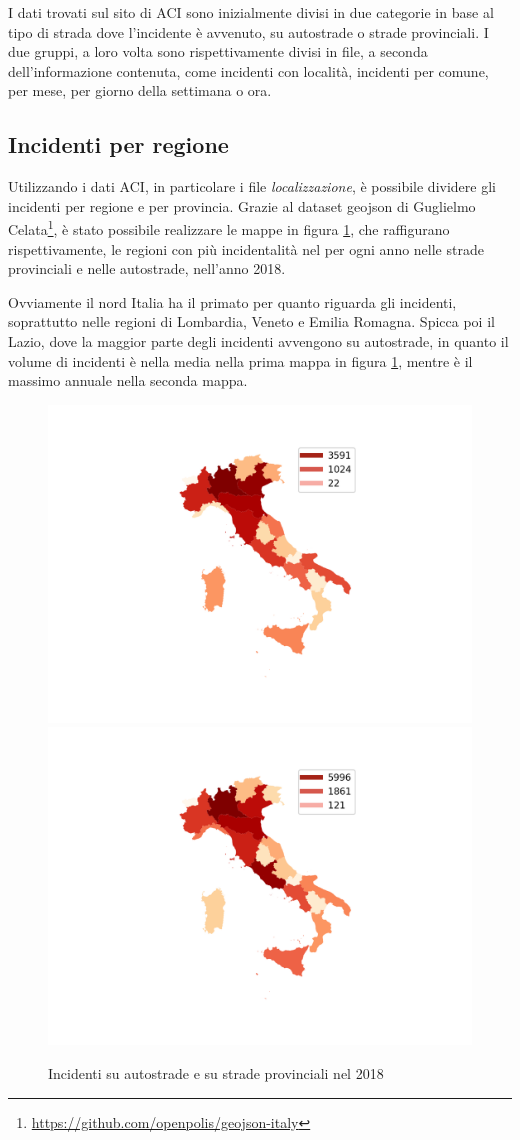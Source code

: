 \documentclass[a4paper]{report}
\begin{document}
I dati trovati sul sito di ACI sono inizialmente divisi in due categorie in 
base al tipo di strada dove l'incidente è avvenuto, su autostrade o strade provinciali.
I due gruppi, a loro volta sono rispettivamente divisi in file, a seconda dell'informazione 
contenuta, come incidenti con località, incidenti per comune, per mese, 
per giorno della settimana o ora.

\subsection{Incidenti per regione}

Utilizzando i dati ACI, in particolare i file \textit{localizzazione}, è possibile dividere gli 
incidenti per regione e per provincia.
Grazie al dataset geojson di Guglielmo Celata\footnote{\url{https://github.com/openpolis/geojson-italy}}, 
è stato possibile realizzare le mappe in figura \ref{fig:incidenti-per-regione}, 
che raffigurano rispettivamente, le regioni con più incidentalità nel per ogni anno nelle 
strade provinciali e nelle autostrade, nell'anno 2018.

Ovviamente il nord Italia ha il primato per quanto riguarda gli incidenti, soprattutto nelle regioni 
di Lombardia, Veneto e Emilia Romagna. 
Spicca poi il Lazio, dove la maggior parte degli incidenti avvengono su autostrade, 
in quanto il volume di incidenti è nella media nella prima mappa in figura 
\ref{fig:incidenti-per-regione}, mentre è il massimo annuale nella seconda mappa.

\begin{figure}
    \includegraphics[width=0.5\linewidth]{../src/incidenti/incidenti_aci/mappe_regioni/incidenti_regione.png}
    \includegraphics[width=0.5\linewidth]{../src/incidenti/incidenti_aci/mappe_regioni/incidenti_regione_autostrade.png}
    \caption{Incidenti su autostrade e su strade provinciali nel 2018}
    \label{fig:incidenti-per-regione}
\end{figure}
\end{document}
